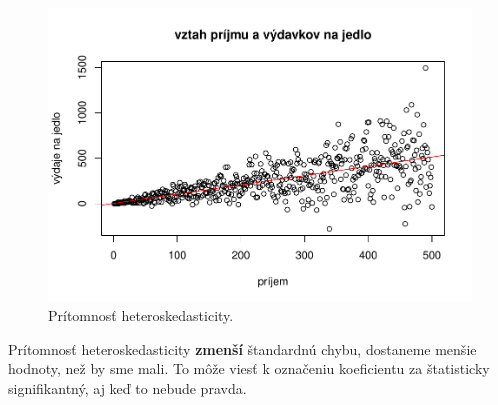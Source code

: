 \begin{Shaded}
\begin{Highlighting}[]
\StringTok{ }\OperatorTok{:}
\StringTok{ }\NormalTok{(} \NormalTok{, }  \OperatorTok{*}\StringTok{ }
\StringTok{ }\OperatorTok{~}\StringTok{ }

\NormalTok{(} \NormalTok{, } \NormalTok{,}
      \NormalTok{)}

 \NormalTok{)}
\end{Highlighting}
\end{Shaded}

\begin{figure}
\begin{center}
\includegraphics[width=1\textwidth,height=\textheight]{test_files/figure-latex/unnamed-chunk-51-1.pdf}
\caption{Prítomnosť heteroskedasticity.}
\end{center}
\end{figure}

Prítomnosť heteroskedasticity \textbf{zmenší} štandardnú chybu,
dostaneme menšie hodnoty, než by sme mali. To môže viesť k označeniu
koeficientu za štatisticky signifikantný, aj keď to nebude pravda.

